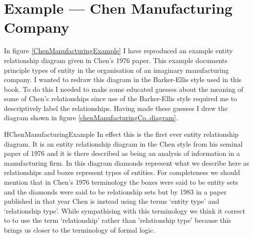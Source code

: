 \section{Example --- Chen Manufacturing Company}
\label{ChenManufacturingCompany}
In figure \ref{ChenManufacturingExample} I have reproduced an example entity relationship diagram  given in Chen's 1976 paper. This example documents principle types of entity in the organisation of an imaginary manufacturing company.  I wanted to redraw
this diagram in the Barker-Ellis style used in this book. To do this I needed to make some educated guesses about the meaning of some of Chen's relationships since use of the Barker-Ellis style  required me to descriptively label the relationships. Having made these guesses I drew the diagram shown
 in figure \ref{chenManufacturingCo..diagram}. 

\begin{erboxedFigure} {H}{ChenManufacturingExample}{
In effect this is the first ever entity relationship diagram. It is an entity relationship diagram in the Chen style from his seminal paper of 1976 and it is there described as being an analysis of information in a manufacturing firm. In this diagram
diamonds represent what we describe here as relationships and boxes represent types of entities.  
For completeness we should mention that in Chen's 1976 terminology the boxes were said to be entity sets and the diamonds were said to be relationship sets but by 1983 in a paper published in that year Chen is instead using the terms `entity type' and `relationship type'. While sympathising with this terminology we think it correct to to use the term `relationship' rather than 'relationship type' because this brings us closer to the terminology of formal logic.
}
\begin{center}
\scalebox{0.80}{}
\end{center}
\end{erboxedFigure}

